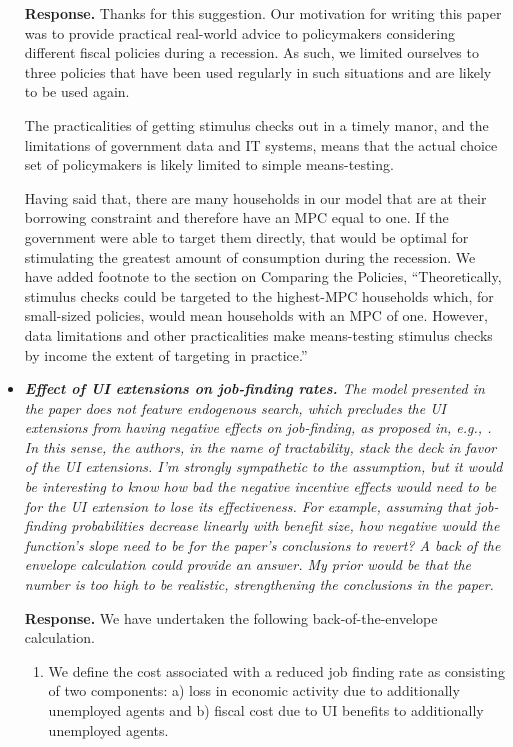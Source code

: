 \documentclass[12pt,letterpaper,english]{article}
\begin{document}
\begin{itemize}
	\noindent \textbf{Response.} Thanks for this suggestion. Our motivation for writing this paper was to provide practical real-world advice to policymakers considering different fiscal policies during a recession. As such, we limited ourselves to three policies that have been used regularly in such situations and are likely to be used again. 
	
	The practicalities of getting stimulus checks out in a timely manor, and the limitations of government data and IT systems, means that the actual choice set of policymakers is likely limited to simple means-testing.
	
	Having said that, there are many households in our model that are at their borrowing constraint and therefore have an MPC equal to one. If the government were able to target them directly, that would be optimal for stimulating the greatest amount of consumption during the recession. We have added footnote to the section on Comparing the Policies, ``Theoretically, stimulus checks could be targeted to the highest-MPC households which, for small-sized policies, would mean households with an MPC of one. However, data limitations and other practicalities make means-testing stimulus checks by income the extent of targeting in practice.''
	
	
	\item \textit{\textbf{Effect of UI extensions on job-finding rates.} The model presented in the paper does not feature endogenous search, which precludes the UI extensions from having negative effects on job-finding, as proposed in, e.g., \citet{mitman2015optimal}. In this sense, the authors, in the name of tractability, stack the deck in favor of the UI extensions. I’m strongly sympathetic to the assumption, but it would be interesting to know how bad the negative incentive effects would need to be for the UI	extension to lose its effectiveness. For example, assuming that job-finding probabilities decrease linearly with benefit size, how negative would the function’s slope need to be for the	paper’s conclusions to revert? A back of the envelope calculation could provide an answer. My prior would be that the number is too high to be realistic, strengthening the conclusions in the paper.}
	
	\noindent \textbf{Response.} We have undertaken the following back-of-the-envelope calculation.
	
	
	
	\begin{enumerate}
		
		\item We define the cost associated with a reduced job finding rate as consisting of two components: a) loss in economic activity due to additionally unemployed agents and b) fiscal cost due to UI benefits to additionally unemployed agents.
		

\end{enumerate}
\end{itemize}
\end{document}
